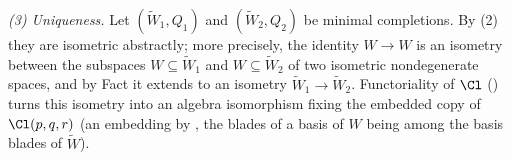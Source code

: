 \emph{(3) Uniqueness.} Let $(\widetilde W_1, Q_1)$ and $(\widetilde W_2, Q_2)$ be minimal completions. By (2) they are isometric abstractly; more precisely, the identity $W \to W$ is an isometry between the subspaces $W \subseteq \widetilde W_1$ and $W \subseteq \widetilde W_2$ of two isometric nondegenerate spaces, and by Fact  it extends to an isometry $\widetilde W_1 \to \widetilde W_2$. Functoriality of $\Cl$ () turns this isometry into an algebra isomorphism fixing the embedded copy of $\Cl(p,q,r)$ (an embedding by , the blades of a basis of $W$ being among the basis blades of $\widetilde W$).

